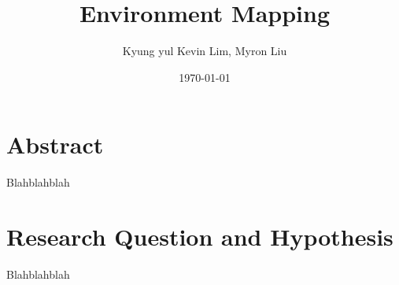 \documentclass[12pt]{article}
\begin{document}
\title{Environment Mapping}
\author{Kyung yul Kevin Lim, Myron Liu}
\date{\today}
\maketitle

\section{Abstract}
Blahblahblah

\section{Research Question and Hypothesis}
Blahblahblah

%
%
\end{document}
